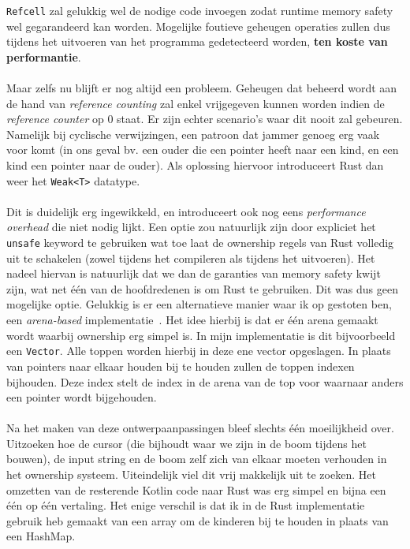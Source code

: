 \texttt{Refcell} zal gelukkig wel de nodige code invoegen zodat runtime memory safety wel gegarandeerd kan worden.
Mogelijke foutieve geheugen operaties zullen dus tijdens het uitvoeren van het programma gedetecteerd worden, \textbf{ten koste van performantie}.
\\ \\
Maar zelfs nu blijft er nog altijd een probleem.
Geheugen dat beheerd wordt aan de hand van \textit{reference counting} zal enkel vrijgegeven kunnen worden indien de \textit{reference counter} op 0 staat.
Er zijn echter scenario's waar dit nooit zal gebeuren.
Namelijk bij cyclische verwijzingen, een patroon dat jammer genoeg erg vaak voor komt (in ons geval bv. een ouder die een pointer heeft naar een kind, en een kind een pointer naar de ouder).
Als oplossing hiervoor introduceert Rust dan weer het \texttt{Weak<T>} datatype.
\\ \\
Dit is duidelijk erg ingewikkeld, en introduceert ook nog eens \textit{performance overhead} die niet nodig lijkt.
Een optie zou natuurlijk zijn door expliciet het \texttt{unsafe} keyword te gebruiken wat toe laat de ownership regels van Rust volledig uit te schakelen (zowel tijdens het compileren als tijdens het uitvoeren).
Het nadeel hiervan is natuurlijk dat we dan de garanties van memory safety kwijt zijn, wat net één van de hoofdredenen is om Rust te gebruiken.
Dit was dus geen mogelijke optie.
Gelukkig is er een alternatieve manier waar ik op gestoten ben, een \textit{arena-based} implementatie~\cite{rust_arena_trees}.
Het idee hierbij is dat er één arena gemaakt wordt waarbij ownership erg simpel is.
In mijn implementatie is dit bijvoorbeeld een \texttt{Vector}.
Alle toppen worden hierbij in deze ene vector opgeslagen.
In plaats van pointers naar elkaar houden bij te houden zullen de toppen indexen bijhouden.
Deze index stelt de index in de arena van de top voor waarnaar anders een pointer wordt bijgehouden.
\\ \\
Na het maken van deze ontwerpaanpassingen bleef slechts één moeilijkheid over.
Uitzoeken hoe de cursor (die bijhoudt waar we zijn in de boom tijdens het bouwen), de input string en de boom zelf zich van elkaar moeten verhouden in het ownership systeem.
Uiteindelijk viel dit vrij makkelijk uit te zoeken.
Het omzetten van de resterende Kotlin code naar Rust was erg simpel en bijna een één op één vertaling.
Het enige verschil is dat ik in de Rust implementatie gebruik heb gemaakt van een array om de kinderen bij te houden in plaats van een HashMap.

